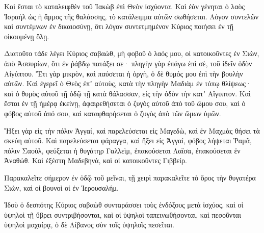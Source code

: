 {Καὶ ἔσται τὸ καταλειφθὲν τοῦ Ἰακὼβ ἐπὶ Θεὸν ἰσχύοντα.
Καὶ ἐὰν γένηται ὁ λαὸς Ἰσραὴλ ὡς ἡ ἄμμος τῆς θαλάσσης, τὸ κατάλειμμα αὐτῶν σωθήσεται.
Λόγον συντελῶν καὶ συντέμνων ἐν δικαιοσύνῃ, ὅτι λόγον συντετμημένον Κύριος ποιήσει ἐν τῇ οἰκουμένῃ ὅλῃ.
\par }{\PP {}Διατοῦτο τάδε λέγει Κύριος σαβαὼθ, μὴ φοβοῦ ὁ λαός μου, οἱ κατοικοῦντες ἐν Σιὼν, ἀπὸ Ἀσσυρίων, ὅτι ἐν ῥάβδῳ πατάξει σε· πληγὴν γὰρ ἐπάγω ἐπὶ σὲ, τοῦ ἰδεῖν ὁδὸν Αἰγύπτου.
Ἔτι γὰρ μικρὸν, καὶ παύσεται ἡ ὀργὴ, ὁ δὲ θυμός μου ἐπὶ τὴν βουλὴν αὐτῶν.
Καὶ ἐγερεῖ ὁ Θεὸς ἐπʼ αὐτοὺς, κατὰ τὴν πληγὴν Μαδιὰμ ἐν τόπῳ θλίψεως· καὶ ὁ θυμὸς αὐτοῦ τῇ ὁδῷ τῇ κατὰ θάλασσαν, εἰς τὴν ὁδὸν τὴν κατʼ Αἴγυπτον.
Καὶ ἔσται ἐν τῇ ἡμέρᾳ ἐκείνῃ, ἀφαιρεθήσεται ὁ ζυγὸς αὐτοῦ ἀπὸ τοῦ ὤμου σου, καὶ ὁ φόβος αὐτοῦ ἀπό σου, καὶ καταφθαρήσεται ὁ ζυγὸς ἀπὸ τῶν ὤμων ὑμῶν.
\par }{\PP {}Ἥξει γὰρ εἰς τὴν πόλιν Ἀγγαί, καὶ παρελεύσεται εἰς Μαγεδὼ, καὶ ἐν Μαχμὰς θήσει τὰ σκεύη αὐτοῦ.
Καὶ παρελεύσεται φάραγγα, καὶ ἥξει εἰς Ἀγγαί, φόβος λήψεται Ῥαμᾶ, πόλιν Σαοὺλ, φεύξεται
ἡ θυγάτηρ Γαλλεὶμ, ἐπακούσεται Λαϊσα, ἐπακούσεται ἐν Ἀναθώθ.
Καὶ ἐξέστη Μαδεβηνὰ, καὶ οἱ κατοικοῦντες Γιββείρ.
\par }{\PP {}Παρακαλεῖτε σήμερον ἐν ὁδῷ τοῦ μεῖναι, τῇ χειρὶ παρακαλεῖτε τὸ ὄρος τὴν θυγατέρα Σιὼν, καὶ οἱ βουνοὶ οἱ ἐν Ἱερουσαλήμ.
\par }{\PP {}Ἰδοὺ ὁ δεσπότης Κύριος σαβαὼθ συνταράσσει τοὺς ἐνδόξους μετὰ ἰσχύος, καὶ οἱ ὑψηλοὶ τῇ ὕβρει συντριβήσονται, καὶ οἱ ὑψηλοὶ ταπεινωθήσονται,
καὶ πεσοῦνται ὑψηλοὶ μαχαίρᾳ, ὁ δὲ Λίβανος σὺν τοῖς ὑψηλοῖς πεσεῖται.

}
